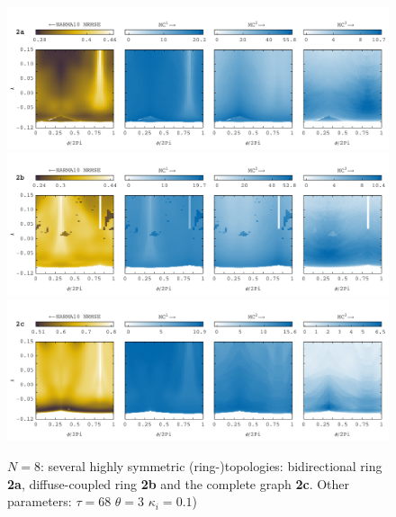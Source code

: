 \begin{figure}\label{fig:N8_basics_ring_capacities}
	\centering
	\includegraphics[width=15cm]{pics/N8/basics/N8_2a_bidir_th3_tau68_vN16_capacities}
	\includegraphics[width=15cm]{pics/N8/basics/N8_2b_diffuse_th3_tau68_vN16_capacities}
	\includegraphics[width=15cm]{pics/N8/basics/N8_2c_all2all_th3_tau68_vN16_capacities}		
	\caption{$N=8$: several highly symmetric (ring-)topologies: bidirectional ring \textbf{2a}, diffuse-coupled ring \textbf{2b} and the complete graph \textbf{2c}.
		Other parameters: $\tau=68$ $\theta=3$ $\kappa_i=0.1$)}
\end{figure}
		
